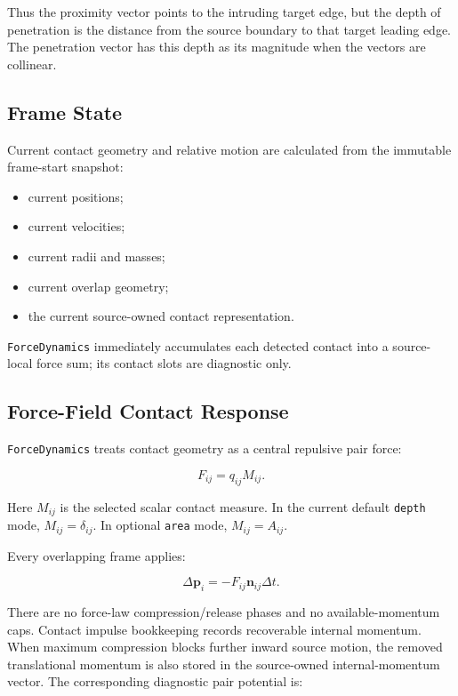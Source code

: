 Thus the proximity vector points to the intruding target edge, but the depth of
penetration is the distance from the source boundary to that target leading
edge.  The penetration vector has this depth as its magnitude when the vectors
are collinear.

\subsection{Frame State}

Current contact geometry and relative motion are calculated from the immutable
frame-start snapshot:

\begin{itemize}
    \item current positions;
    \item current velocities;
    \item current radii and masses;
    \item current overlap geometry;
    \item the current source-owned contact representation.
\end{itemize}

\texttt{ForceDynamics} immediately accumulates each detected contact into a
source-local force sum; its contact slots are diagnostic only.

\subsection{Force-Field Contact Response}

\texttt{ForceDynamics} treats contact geometry as a central repulsive pair
force:

\begin{equation}
F_{ij}=q_{ij}M_{ij}.
\end{equation}

Here \(M_{ij}\) is the selected scalar contact measure.  In the current default
\texttt{depth} mode, \(M_{ij}=\delta_{ij}\).  In optional \texttt{area} mode,
\(M_{ij}=A_{ij}\).

Every overlapping frame applies:

\begin{equation}
\Delta\mathbf p_i=-F_{ij}\mathbf n_{ij}\Delta t.
\end{equation}

There are no force-law compression/release phases and no available-momentum
caps.  Contact impulse bookkeeping records recoverable internal momentum.
When maximum compression blocks further inward source motion, the removed
translational momentum is also stored in the source-owned internal-momentum
vector.  The corresponding diagnostic pair potential is:

